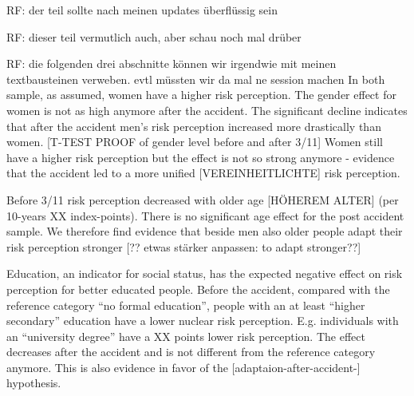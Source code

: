 {%
RF: der teil sollte nach meinen updates überflüssig sein  


RF: dieser teil vermutlich auch, aber schau noch mal drüber


RF: die folgenden drei abschnitte können wir irgendwie mit meinen textbausteinen verweben. evtl müssten wir da mal ne session machen
In both sample, as assumed, women have a higher risk perception. The gender effect for women is not as high anymore after the accident. The significant decline indicates that after the accident men's risk perception increased more drastically than women. [T-TEST PROOF of gender level before and after 3/11] Women still have a higher risk perception but the effect is not so strong anymore - evidence that the accident led to a more unified [VEREINHEITLICHTE] risk perception.  

Before 3/11 risk perception decreased with older age [HÖHEREM ALTER] (per 10-years XX index-points). There is no significant age effect for the post accident sample. We therefore find evidence that beside men also older people adapt their risk perception stronger [?? etwas stärker anpassen: to adapt stronger??]   


Education, an indicator for social status, has the expected negative effect on risk perception for better educated people. Before the accident, compared with the reference category ``no formal education'', people with an at least ``higher secondary''  education have a lower nuclear risk perception. E.g. individuals with an ``university degree'' have a XX points lower risk perception. The effect decreases after the accident and is not different from the reference category anymore. This is also evidence in favor of the [adaptaion-after-accident-] hypothesis.


}
